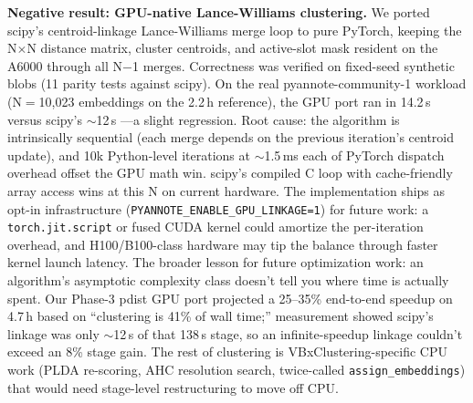 \documentclass[conference,10pt]{IEEEtran}
\begin{document}
\vspace{0.5em}
\noindent\textbf{Negative result: GPU-native Lance-Williams clustering.}\quad
We ported scipy's centroid-linkage Lance-Williams merge loop to pure PyTorch,
keeping the N$\times$N distance matrix, cluster centroids, and active-slot
mask resident on the A6000 through all N$-$1 merges. Correctness was
verified on fixed-seed synthetic blobs (11 parity tests against scipy).
On the real pyannote-community-1 workload (N$=$10{,}023 embeddings on the
2.2\,h reference), the GPU port ran in 14.2\,s versus scipy's ${\sim}$12\,s
---a slight regression. Root cause: the algorithm is intrinsically sequential
(each merge depends on the previous iteration's centroid update), and 10k
Python-level iterations at ${\sim}$1.5\,ms each of PyTorch dispatch overhead
offset the GPU math win. scipy's compiled C loop with cache-friendly array
access wins at this N on current hardware. The implementation ships as
opt-in infrastructure (\texttt{PYANNOTE\_ENABLE\_GPU\_LINKAGE=1}) for future
work: a \texttt{torch.jit.script} or fused CUDA kernel could amortize the
per-iteration overhead, and H100/B100-class hardware may tip the balance
through faster kernel launch latency. The broader lesson for future
optimization work: an algorithm's asymptotic complexity class doesn't tell
you where time is actually spent. Our Phase-3 pdist GPU port projected a
25--35\% end-to-end speedup on 4.7\,h based on ``clustering is 41\% of wall
time;'' measurement showed scipy's linkage was only ${\sim}$12\,s of that
138\,s stage, so an infinite-speedup linkage couldn't exceed an 8\% stage
gain. The rest of clustering is VBxClustering-specific CPU work (PLDA
re-scoring, AHC resolution search, twice-called \texttt{assign\_embeddings})
that would need stage-level restructuring to move off CPU.
\end{document}
